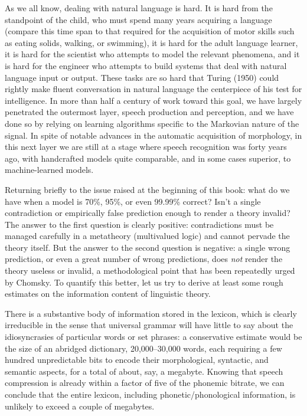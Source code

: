 As we all know, dealing with natural language is hard. It is hard from the
standpoint of the child, who must spend many years acquiring a language
(compare this time span to that required for the acquisition of motor skills
such as eating solids, walking, or swimming), it is hard for the adult language
learner, it is hard for the scientist who attempts to model the relevant
phenomena, and it is hard for the engineer who attempts to build systems that
deal with natural language input or output. These tasks are so hard that
Turing (1950)\nocite{Turing:1950} could rightly make fluent conversation in
natural language the centerpiece of his test for intelligence. In more than
half a century of work toward this goal, we have largely penetrated the
outermost layer, speech production and perception, and we have done so by
relying on learning algorithms specific to the Markovian nature of the
signal. In spite of notable advances in the automatic acquisition of
morphology, in this next layer we are still at a stage where speech
recognition was forty years ago, with handcrafted models quite comparable,
and in some cases superior, to machine-learned models. 

Returning briefly to the issue raised at the beginning of this book: what do
we have when a model is 70\%, 95\%, or even 99.99\% correct? Isn't a single
contradiction or empirically false prediction enough to render a theory
invalid? The answer to the first question is clearly positive: contradictions
must be managed carefully in a metatheory (multivalued logic) and cannot
pervade the theory itself. But the answer to the second question is negative:
a single wrong prediction, or even a great number of wrong predictions, does
{\it not} render the theory useless or invalid, a methodological point that
has been repeatedly urged by Chomsky. To quantify this better, let us try to
derive at least some rough estimates on the information content of linguistic
theory.  

There is a substantive body of information stored in the lexicon, which is
clearly irreducible in the sense that universal grammar will have little to
say about the idiosyncrasies of particular words or set phrases: a
conservative estimate would be the size of an abridged dictionary,
20,000--30,000 words, each requiring a few hundred unpredictable bits
to encode their morphological, syntactic, and semantic aspects, for a total of
about, say, a megabyte. Knowing that speech compression is already within a
factor of five of the phonemic bitrate, we can conclude that the entire
lexicon, including phonetic/phonological information, is unlikely to exceed a
couple of megabytes.

